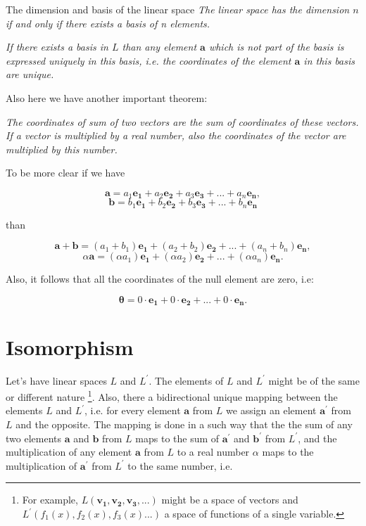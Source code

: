 \documentclass{book}
\begin{document}
\begin{section}{The dimension and basis of the linear space}
\emph{The linear space has the dimension $n$ if and only if there exists a basis of n elements.}

\emph{If there exists a basis in $L$ than any element $\boldsymbol{a}$ which is not part of the basis is expressed uniquely in this basis, i.e. the coordinates of the element $\boldsymbol{a}$ in this basis are unique.}

Also here we have another important theorem:

\emph{The coordinates of sum of two vectors are the sum of coordinates of these vectors. If a vector is multiplied by a real number, also the coordinates of the vector are multiplied by this number.}

To be more clear if we have

\[\boldsymbol{a} = a_1\boldsymbol{e_1} + a_2\boldsymbol{e_2} + a_3\boldsymbol{e_3} + ... + a_n\boldsymbol{e_n},\]
\[\boldsymbol{b} = b_1\boldsymbol{e_1} + b_2\boldsymbol{e_2} + b_3\boldsymbol{e_3} + ... + b_n\boldsymbol{e_n}\]

than

\[\boldsymbol{a} + \boldsymbol{b} = (a_1 + b_1)\boldsymbol{e_1} + (a_2 + b_2)\boldsymbol{e_2} + ... + (a_n + b_n)\boldsymbol{e_n},\]
\[{\alpha}\boldsymbol{a} = ({\alpha}a_1)\boldsymbol{e_1} + ({\alpha}a_2)\boldsymbol{e_2} + ... + ({\alpha}a_n)\boldsymbol{e_n}.\]

Also, it follows that all the coordinates of the null element are zero, i.e:

\[\boldsymbol{\theta} = 0{\cdot}\boldsymbol{e_1} + 0{\cdot}\boldsymbol{e_2} + ... + 0{\cdot}\boldsymbol{e_n}.\]
\end{section}

\section{Isomorphism}

Let's have linear spaces $L$ and $L^'$. The elements of $L$ and $L^'$ might be of the same or different nature \footnote{For example, $L(\boldsymbol{v_1}, \boldsymbol{v_2}, \boldsymbol{v_3},...)$ might be a space of vectors and $L^{'}(f_1(x), f_2(x), f_3(x) ...)$ a space of functions of a single variable.}. Also, there a bidirectional unique mapping between the elements $L$ and ${L^{'}}$, i.e. for every element $\boldsymbol{a}$ from $L$ we assign an element $\boldsymbol{a^{'}}$ from $L$ and the opposite. The mapping is done in a such way that the the sum of any two elements $\boldsymbol{a}$ and $\boldsymbol{b}$ from $L$ maps to the sum of $\boldsymbol{a^{'}}$ and $\boldsymbol{b^{'}}$ from $L^{'}$, and the multiplication of any element $\boldsymbol{a}$ from $L$ to a real number $\alpha$ maps to the multiplication of $\boldsymbol{a^{'}}$ from $L^{'}$ to the same number, i.e.
\end{document}
